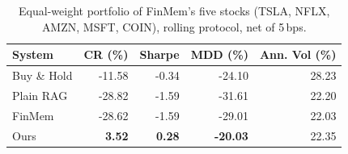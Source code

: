 \begin{table}[ht]
\centering
\caption{Equal-weight portfolio of FinMem's five stocks (TSLA, NFLX, AMZN, MSFT, COIN), rolling protocol, net of 5\,bps.}
\label{tab:finmem5}
\begin{tabular}{lrrrr}
\hline
System & CR (\%) & Sharpe & MDD (\%) & Ann. Vol (\%) \\
\hline
Buy \& Hold & -11.58 & -0.34 & -24.10 & 28.23 \\
Plain RAG & -28.82 & -1.59 & -31.61 & 22.20 \\
FinMem & -28.62 & -1.59 & -29.01 & 22.03 \\
Ours & \textbf{3.52} & \textbf{0.28} & \textbf{-20.03} & 22.35 \\
\hline
\end{tabular}
\end{table}
